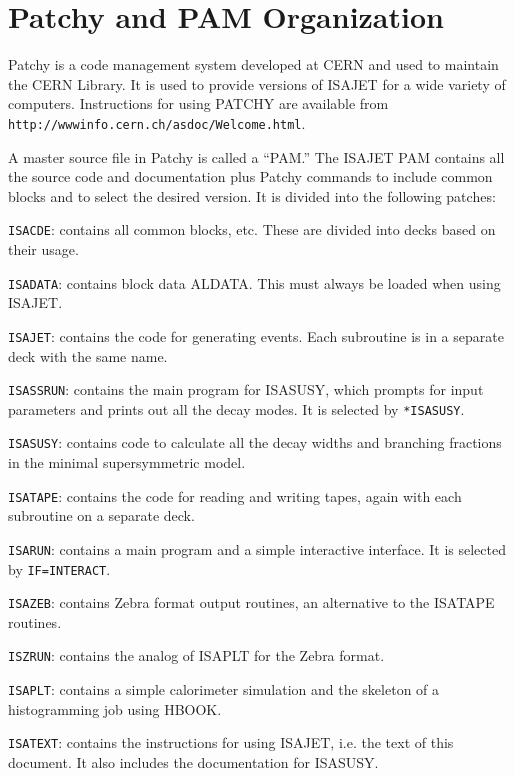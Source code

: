\newpage
\section{Patchy and PAM Organization\label{PATCHY}}

      Patchy is a code management system developed at CERN and used to
maintain the CERN Library. It is used to provide versions of ISAJET for
a wide variety of computers. Instructions for using PATCHY are
available from \verb|http://wwwinfo.cern.ch/asdoc/Welcome.html|.

      A master source file in Patchy is called a ``PAM.'' The ISAJET
PAM contains all the source code and documentation plus Patchy
commands to include common blocks and to select the desired version. It
is divided into the following patches: 

      \verb|ISACDE|: contains all common blocks, etc. These are divided
into decks based on their usage.

      \verb|ISADATA|: contains block data ALDATA. This must always be
loaded when using ISAJET.

      \verb|ISAJET|: contains the code for generating events. Each
subroutine is in a separate deck with the same name.

      \verb|ISASSRUN|: contains the main program for ISASUSY, which
prompts for input parameters and prints out all the decay modes. It is
selected by \verb|*ISASUSY|.

      \verb|ISASUSY|: contains code to calculate all the decay widths
and branching fractions in the minimal supersymmetric model.

      \verb|ISATAPE|: contains the code for reading and writing tapes,
again with each subroutine on a separate deck.

      \verb|ISARUN|: contains a main program and a simple interactive
interface.  It is selected by \verb|IF=INTERACT|.

      \verb|ISAZEB|: contains Zebra format output routines, an
alternative to the ISATAPE routines.

      \verb|ISZRUN|: contains the analog of ISAPLT for the Zebra
format. 

      \verb|ISAPLT|: contains a simple calorimeter simulation and the
skeleton of a histogramming job using HBOOK.

      \verb|ISATEXT|: contains the instructions for using ISAJET, i.e.
the text of this document. It also includes the documentation for
ISASUSY.

